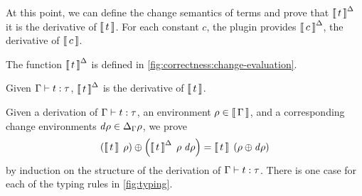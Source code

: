 At this point, we can define the change semantics of terms and
prove that $\EvalInc{t}$ it is the derivative of $\Eval{t}$. For
each constant $c$, the plugin provides $\EvalInc{c}$, the derivative
of $\Eval{c}$.

\begin{definition}
  \label{def:change-evaluation}
  The function $\EvalInc{t}$ is defined in
  \cref{fig:correctness:change-evaluation}.
\end{definition}

\begin{lemma}
  \label{lem:change-semantics-correct}
  Given $\Typing{t}{\Gt}$, $\EvalInc{t}$ is the derivative of $\Eval{t}$.
\end{lemma}

\begin{optionalproof}
  Given a derivation of $\Typing{t}{\Gt}$, an environment $\Gr
  \in \Eval{\GG}$, and a corresponding change environments $\D
  \Gr \in \Change[\GG]{\Gr}$, we prove
  \[
    \Apply{\EvalIncWith*{t}{\Gr}{\D \Gr}}
          {\EvalWith*{t}{\Gr}}
    =
    \EvalWith{t}{\Apply*{\D \Gr}{\Gr}}
  \]
  by induction on the structure of the derivation of
  $\Typing{t}{\Gt}$. There is one case for each of the typing
  rules in \cref{fig:typing}.


\end{optionalproof}

